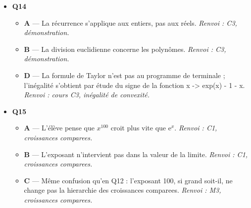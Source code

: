 \begin{itemize}
\begin{itemize}
    \item \textbf{D} — On peut conclure grace aux croissances comparees. \emph{Renvoi : M3, pas a pas.}
  \end{itemize}
  \item \textbf{Q14}
  \begin{itemize}
    \item \textbf{A} — La récurrence s'applique aux entiers, pas aux réels. \emph{Renvoi : C3, démonstration.}
    \item \textbf{B} — La division euclidienne concerne les polynômes. \emph{Renvoi : C3, démonstration.}
    \item \textbf{D} — La formule de Taylor n'est pas au programme de terminale ; l'inégalité s'obtient par étude du signe de la fonction x -> exp(x) - 1 - x. \emph{Renvoi : cours C3, inégalité de convexité.}
  \end{itemize}
  \item \textbf{Q15}
  \begin{itemize}
    \item \textbf{A} — L'élève pense que $x^{100}$ croit plus vite que $\mathrm{e}^x$. \emph{Renvoi : C1, croissances comparees.}
    \item \textbf{B} — L'exposant n'intervient pas dans la valeur de la limite. \emph{Renvoi : C1, croissances comparees.}
    \item \textbf{C} — Même confusion qu'en Q12 : l'exposant 100, si grand soit-il, ne change pas la hierarchie des croissances comparees. \emph{Renvoi : M3, croissances comparees.}
  \end{itemize}
\end{itemize}
\fi
